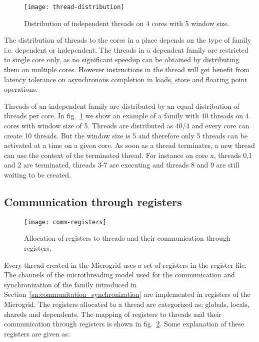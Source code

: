 \documentclass{article}
\begin{document}
\begin{figure}
\begin{centering}
\label{Neighborhood}
    \texttt{[image: thread-distribution]}
    \caption{\label{fig:thread_distribution}Distribution of independent threads on 4 cores with 5 window size.}
\end{centering}
\end{figure}

The distribution of threads to the cores in a place depends on the type of
family i.e. dependent or independent. The threads in a dependent family are
restricted to single core only, as no significant speedup can be obtained by
distributing them on multiple cores. However instructions in the thread will
get benefit from latency tolerance on asynchronous completion in loads, store
and floating point operations.

Threads of an independent family are distributed by an equal distribution of
threads per core. In fig.~\ref{fig:thread_distribution} we show an example of a
family with 40 threads on 4 cores with window size of 5. Threads are
distributed as 40/4 and every core can create 10 threads. But the window size
is 5 and therefore only 5 threads can be activated at a time on a given core.
As soon as a thread terminates, a new thread can use the context of the
terminated thread. For instance on core x, threads 0,1 and 2 are terminated,
threads 3-7 are executing and threads 8 and 9 are still waiting to be
created.

\subsection{Communication through registers}\label{sn:registers}

\begin{figure}
\begin{centering}
    \texttt{[image: comm-registers]}
    \caption{\label{fig:comm_registers}Allocation of registers to threads and their communication through
    registers.}
\end{centering}
\end{figure}

Every thread created in the Microgrid uses a set of registers in the register
file. The channels of the microthreading model used for the communication and
synchronization of the family introduced
in Section~\ref{sn:communitation_synchronization} are implemented in registers of the
Microgrid. The registers allocated to a thread are categorized as; globals,
locals, shareds and dependents. The mapping of registers to threads and their
communication through registers is shown in fig.~\ref{fig:comm_registers}. Some
explanation of these registers are given as:
\end{document}
